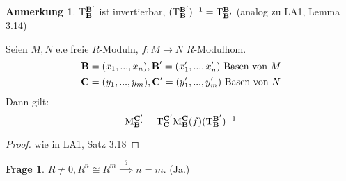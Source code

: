 \documentclass[a4paper, titlepage]{article}
\theoremstyle{definition}
\newtheorem*{anm}{Anmerkung}
\newtheorem*{frage}{Frage}
\newcommand{\B}{\text{\textbf{B}}}
\newcommand{\CB}{\text{\textbf{C}}}
\newcommand{\T}[2][1]{\mathrm{T}_{#2}^{#1}}
\newcommand{\MS}[2][1]{\mathrm{M}_{#2}^{#1}}
\begin{document}
        \begin{anm}
            $\T[\B']{\B}$ ist invertierbar, $(\T[\B']{\B})^{-1}=\T[\B]{\B'}$ (analog zu LA1, Lemma 3.14)
        \end{anm}
        \begin{satz}[Basiswechselsatz]
            Seien $M,N$ e.e freie $R$-Moduln, $f:M\longrightarrow N $ $R$-Modulhom.
            \begin{align*}
                \B&=(x_1,...,x_n), \B'=(x_1',...,x_n') \text{ Basen von }M\\
                \CB&=(y_1,...,y_m), \CB'=(y_1',...,y_m') \text{ Basen von } N
            \end{align*}
            Dann gilt:
            $$\MS[\CB']{\B'}=\T[\CB']{\CB}\MS[\CB]{\B}(f)(\T[\B']{\B})^{-1}$$
        \end{satz}
        \begin{proof}
            wie in LA1, Satz 3.18
        \end{proof}
        \begin{frage}
            $R\neq 0, R^n \cong R^m \overset{\text{?}}{\implies} n=m.$ (Ja.)
        \end{frage}
\end{document}
